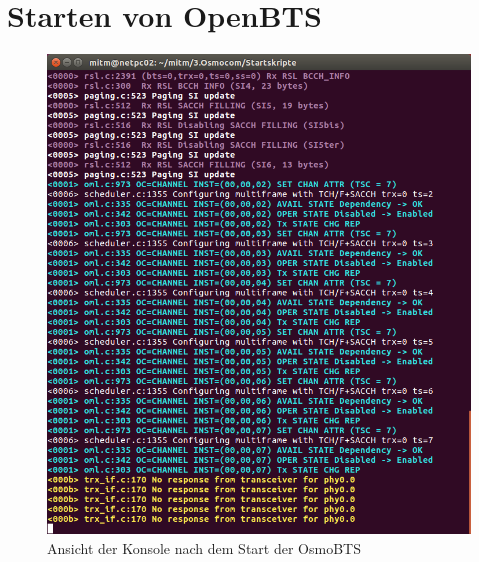 \newpage

\section{Starten von OpenBTS}

\begin{figure}[h] %
\centering
\includegraphics[width=15cm]{includes/Start_OsmoBTS}
\caption{Ansicht der Konsole nach dem Start der OsmoBTS}
\label{fig:OsmoBTS}
\end{figure}
